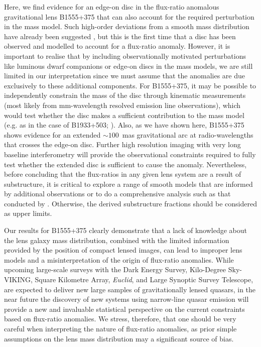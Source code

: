 \documentclass[a4paper,fleqn,usenatbib,useAMS]{mnras}
\begin{document}
Here, we find evidence for an edge-on disc in the flux-ratio anomalous gravitational lens B1555+375 that can also account for the required perturbation in the mass model. Such high-order deviations from a smooth mass distribution have already been suggested \citep{evans03,congdon05}, but this is the first time that a disc has been observed and modelled to account for a flux-ratio anomaly. However, it is important to realise that by including observationally motivated perturbations like luminous dwarf companions or edge-on discs in the mass models, we are still limited in our interpretation since we must assume that the anomalies are due exclusively to these additional components. For B1555+375, it may be possible to independently constrain the mass of the disc through kinematic measurements (most likely from mm-wavelength resolved emission line observations), which would test whether the disc makes a sufficient contribution to the mass model (e.g. as in the case of B1933+503; \citealt{suyu12}). Also, as we have shown here, B1555+375 shows evidence for an extended $\sim100$~mas gravitational arc at radio-wavelengths that crosses the edge-on disc. Further high resolution imaging with very long baseline interferometry will provide the observational constraints required to fully test whether the extended disc is sufficient to cause the anomaly. Nevertheless, before concluding that the flux-ratios in any given lens system are a result of substructure, it is critical to explore a range of smooth models that are informed by additional observations or to do a comprehensive analysis such as that conducted by \citet{Xu15}. Otherwise, the derived substructure fractions should be considered as upper limits.
 
Our results for B1555+375 clearly demonstrate that a lack of knowledge about the lens galaxy mass distribution, combined with the limited information provided by the position of compact lensed images, can lead to improper lens models and a misinterpretation of the origin of flux-ratio anomalies. While upcoming large-scale surveys with the Dark Energy Survey, Kilo-Degree Sky-VIKING, Square Kilometre Array, {\it Euclid}, and Large Synoptic Survey Telescope, are expected to deliver new large samples of gravitationally lensed quasars, in the near future the discovery of new systems using narrow-line quasar emission \citep{N14} will provide a new and invaluable statistical perspective on the current constraints based on flux-ratio anomalies. We stress, therefore, that one should be very careful when interpreting the nature of flux-ratio anomalies, as prior simple assumptions on the lens mass distribution may a significant source of bias. 
\end{document}
